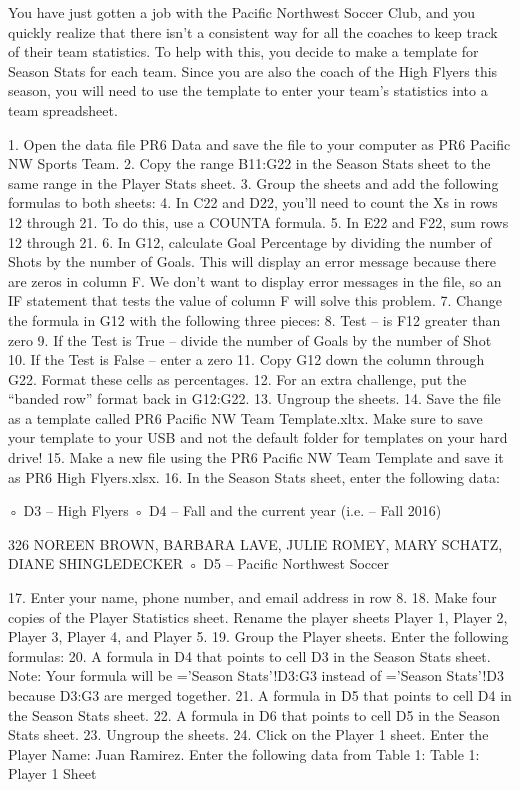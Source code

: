 You have just gotten a job with the Pacific Northwest Soccer Club, and you quickly realize that there
isn’t a consistent way for all the coaches to keep track of their team statistics. To help with this,
you decide to make a template for Season Stats for each team. Since you are also the coach of the
High Flyers this season, you will need to use the template to enter your team’s statistics into a team
spreadsheet.

1. Open the data file PR6 Data and save the file to your computer as PR6 Pacific NW Sports
Team.
2. Copy the range B11:G22 in the Season Stats sheet to the same range in the Player Stats sheet.
3. Group the sheets and add the following formulas to both sheets:
4. In C22 and D22, you’ll need to count the Xs in rows 12 through 21. To do this, use a COUNTA
formula.
5. In E22 and F22, sum rows 12 through 21.
6. In G12, calculate Goal Percentage by dividing the number of Shots by the number of Goals. This
will display an error message because there are zeros in column F. We don’t want to display
error messages in the file, so an IF statement that tests the value of column F will solve this
problem.
7. Change the formula in G12 with the following three pieces:
8. Test – is F12 greater than zero
9. If the Test is True – divide the number of Goals by the number of Shot
10. If the Test is False – enter a zero
11. Copy G12 down the column through G22. Format these cells as percentages.
12. For an extra challenge, put the “banded row” format back in G12:G22.
13. Ungroup the sheets.
14. Save the file as a template called PR6 Pacific NW Team Template.xltx. Make sure to save your
template to your USB and not the default folder for templates on your hard drive!
15. Make a new file using the PR6 Pacific NW Team Template and save it as PR6 High Flyers.xlsx.
16. In the Season Stats sheet, enter the following data:

◦ D3 – High Flyers
◦ D4 – Fall and the current year (i.e. – Fall 2016)


326 NOREEN BROWN, BARBARA LAVE, JULIE ROMEY, MARY SCHATZ, DIANE SHINGLEDECKER
◦ D5 – Pacific Northwest Soccer

17. Enter your name, phone number, and email address in row 8.
18. Make four copies of the Player Statistics sheet. Rename the player sheets Player 1, Player 2,
Player 3, Player 4, and Player 5.
19. Group the Player sheets. Enter the following formulas:
20. A formula in D4 that points to cell D3 in the Season Stats sheet. Note: Your formula will be
=’Season Stats’!D3:G3 instead of =’Season Stats’!D3 because D3:G3 are merged together.
21. A formula in D5 that points to cell D4 in the Season Stats sheet.
22. A formula in D6 that points to cell D5 in the Season Stats sheet.
23. Ungroup the sheets.
24. Click on the Player 1 sheet. Enter the Player Name: Juan Ramirez. Enter the following data
from Table 1:
Table 1: Player 1 Sheet

